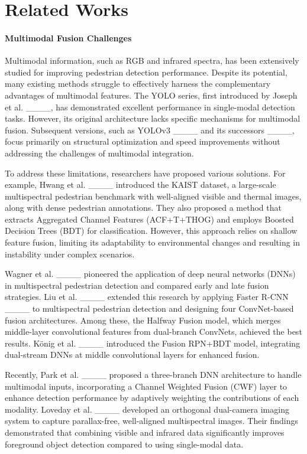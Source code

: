 \section{Related Works}
\paragraph{Multimodal Fusion Challenges}
Multimodal information, such as RGB and infrared spectra, has been extensively studied for improving pedestrian detection performance. Despite its potential, many existing methods struggle to effectively harness the complementary advantages of multimodal features. The YOLO series, first introduced by Joseph et al. ____, has demonstrated excellent performance in single-modal detection tasks. However, its original architecture lacks specific mechanisms for multimodal fusion. Subsequent versions, such as YOLOv3 ____ and its successors ____, focus primarily on structural optimization and speed improvements without addressing the challenges of multimodal integration.

To address these limitations, researchers have proposed various solutions. For example, Hwang et al. ____ introduced the KAIST dataset, a large-scale multispectral pedestrian benchmark with well-aligned visible and thermal images, along with dense pedestrian annotations. They also proposed a method that extracts Aggregated Channel Features (ACF+T+THOG) and employs Boosted Decision Trees (BDT) for classification. However, this approach relies on shallow feature fusion, limiting its adaptability to environmental changes and resulting in instability under complex scenarios.

Wagner et al. ____ pioneered the application of deep neural networks (DNNs) in multispectral pedestrian detection and compared early and late fusion strategies. Liu et al. ____ extended this research by applying Faster R-CNN  ____ to multispectral pedestrian detection and designing four ConvNet-based fusion architectures. Among these, the Halfway Fusion model, which merges middle-layer convolutional features from dual-branch ConvNets, achieved the best results. König et al. ____ introduced the Fusion RPN+BDT model, integrating dual-stream DNNs at middle convolutional layers for enhanced fusion.


Recently, Park et al.  ____ proposed a three-branch DNN architecture to handle multimodal inputs, incorporating a Channel Weighted Fusion (CWF) layer to enhance detection performance by adaptively weighting the contributions of each modality. Loveday et al.  ____ developed an orthogonal dual-camera imaging system to capture parallax-free, well-aligned multispectral images. Their findings demonstrated that combining visible and infrared data significantly improves foreground object detection compared to using single-modal data.
